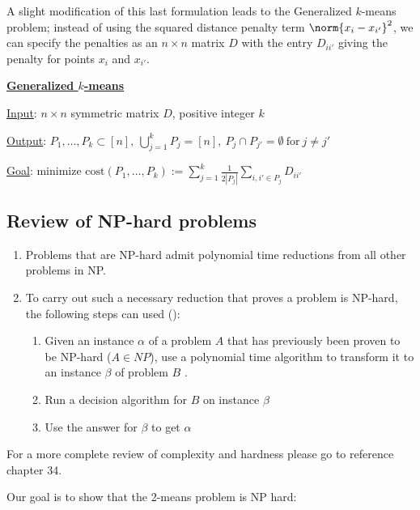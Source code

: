 A slight modification of this last formulation leads to the Generalized
$k$-means problem; instead of using the squared distance penalty term
$\norm{x_i - x_{i'}}^2$, we can specify the penalties as an $n \times n$
matrix $D$ with the entry $D_{ii'}$ giving the penalty for points $x_i$
and $x_{i'}$.

\begin{mdframed}
    \underline{\textbf{Generalized $k$-means}}
    
    \vspace{0.5em} \underline{Input}:
    $n \times n$ symmetric matrix $D$, positive integer $k$
    
    \vspace{0.5em} \underline{Output}: $P_1, \ldots, P_k \subset [n],
    ~\bigcup_{j=1}^k P_j = [n],
    ~P_j \cap P_{j'} = \emptyset ~\text{for}~ j \ne j'$
    
    \vspace{0.5em} \underline{Goal}: minimize
    $\text{cost}(P_1, \ldots, P_k) := \sum\limits_{j=1}^{k}
    \frac{1}{2 |P_j|} \sum\limits_{i,i' \in P_j} D_{ii'}$
\end{mdframed}

\subsection{Review of NP-hard problems}
\begin{enumerate}
\item Problems that are NP-hard admit polynomial time
  reductions from all other problems in NP.
\item To carry out such a necessary reduction that proves a problem is NP-hard, the following steps can used (\cite{cor2009}): 
\begin{enumerate}
\item Given an instance $\alpha$ of a problem $A$ that has previously
  been proven to be NP-hard ($A \in NP$), use a polynomial time algorithm to transform it to an instance $\beta$ of problem $B$ .
\item Run a decision algorithm for $B$ on instance $\beta$ 
\item Use the answer for $\beta$ to get $\alpha$
\end{enumerate} 
\end{enumerate} 

For a more complete review of complexity and hardness please go to
reference \cite{cor2009} chapter 34.

Our goal is to show that the 2-means problem is NP hard:

